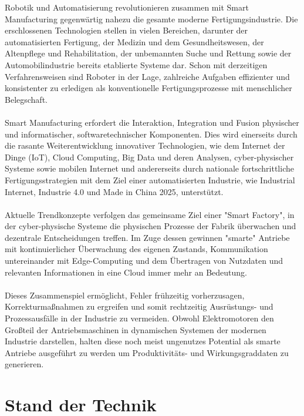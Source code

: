 \documentclass[Bachelor, BMR, ngerman]{twbook}
\begin{document}
    Robotik und Automatisierung revolutionieren zusammen mit Smart Manufacturing gegenwärtig nahezu die gesamte moderne Fertigungsindustrie. \cite{FrDe18,TaQi19} Die erschlossenen Technologien stellen in vielen Bereichen, darunter der automatisierten Fertigung, der Medizin und dem Gesundheitswesen, der Altenpflege und Rehabilitation, der unbemannten Suche und Rettung sowie der Automobilindustrie bereits etablierte Systeme dar. \cite{Eg14,SaDa18} Schon mit derzeitigen Verfahrensweisen sind Roboter in der Lage, zahlreiche Aufgaben effizienter und konsistenter zu erledigen als konventionelle Fertigungsprozesse mit menschlicher Belegschaft. \cite{FrDe18}\\
    \\
    Smart Manufacturing erfordert die Interaktion, Integration und Fusion physischer und informatischer, softwaretechnischer Komponenten. Dies wird einerseits durch die rasante Weiterentwicklung innovativer Technologien, wie dem Internet der Dinge (IoT), Cloud Computing, Big Data und deren Analysen, cyber-physischer Systeme sowie mobilen Internet und andererseits durch nationale fortschrittliche Fertigungsstrategien mit dem Ziel einer automatisierten Industrie, wie Industrial Internet, Industrie 4.0 und Made in China 2025, unterstützt. \cite{TaQi19}\\
    \\
    Aktuelle Trendkonzepte verfolgen das gemeinsame Ziel einer "Smart Factory", in der cyber-physische Systeme die physischen Prozesse der Fabrik überwachen und dezentrale Entscheidungen treffen. Im Zuge dessen gewinnen "smarte" Antriebe mit kontinuierlicher Überwachung des eigenen Zustands, Kommunikation untereinander mit Edge-Computing und dem Übertragen von Nutzdaten und relevanten Informationen in eine Cloud immer mehr an Bedeutung.\\
    \\
    Dieses Zusammenspiel ermöglicht, Fehler frühzeitig vorherzusagen, Korrekturmaßnahmen zu ergreifen und somit rechtzeitig Ausrüstungs- und Prozessausfälle in der Industrie zu vermeiden. Obwohl Elektromotoren den Großteil der Antriebsmaschinen in dynamischen Systemen der modernen Industrie darstellen, halten diese noch meist ungenutzes Potential als smarte Antriebe ausgeführt zu werden um Produktivitäts- und Wirkungsgraddaten zu generieren. \cite{DoBh18}

\chapter{Stand der Technik}
    
\end{document}
